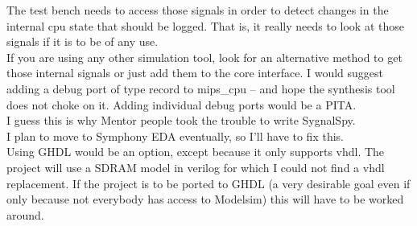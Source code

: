     The test bench needs to access those signals in order to detect changes in
    the internal cpu state that should be logged. That is, it really needs to
    look at those signals if it is to be of any use.\\

    If you are using any other simulation tool, look for an alternative method
    to get those internal signals or just add them to the core interface. I
    would suggest adding a debug port of type record to mips\_cpu -- and hope the
    synthesis tool does not choke on it. Adding individual debug ports would be
    a PITA.\\
    I guess this is why Mentor people took the trouble to write SygnalSpy.\\

    I plan to move to Symphony EDA eventually, so I'll have to fix this.\\
    
    Using GHDL would be an option, except because it only supports vhdl. The
    project will use a SDRAM model in verilog for which I could not find a
    vhdl replacement. If the project is to be ported to GHDL (a very desirable 
    goal even if only because not everybody has access to Modelsim) this will 
    have to be worked around.\\

